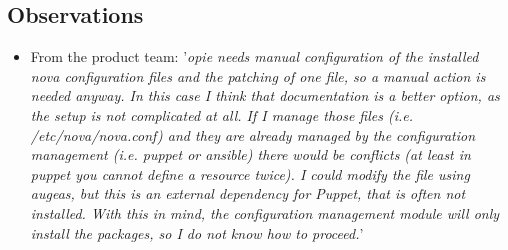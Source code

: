 \documentclass[a4wide,11pt]{article}
\begin{document}
\subsection{Observations}
\begin{itemize}
        \item From the product team: '\textit{opie needs manual configuration of the installed nova configuration files and the patching of one file, so a manual action is needed anyway. In this case I think that documentation is a better option, as the setup is not complicated at all. If I manage those files (i.e. /etc/nova/nova.conf) and they are already managed by the configuration management (i.e. puppet or ansible) there would be conflicts (at least in puppet you cannot define a resource twice). I could modify the file using augeas, but this is an external dependency for Puppet, that is often not installed. With this in mind, the configuration management module will only install the packages, so I do not know how to proceed.}'
    \end{itemize}


\newpage

\end{document}

